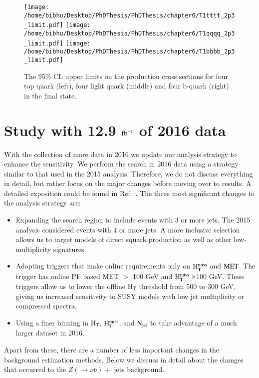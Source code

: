\begin{figure}[h]
\centering
\texttt{[image: /home/bibhu/Desktop/PhDThesis/PhDThesis/chapter6/T1tttt\_2p3\_limit.pdf]}
\texttt{[image: /home/bibhu/Desktop/PhDThesis/PhDThesis/chapter6/T1qqqq\_2p3\_limit.pdf]}
\texttt{[image: /home/bibhu/Desktop/PhDThesis/PhDThesis/chapter6/T1bbbb\_2p3\_limit.pdf]}
\caption{\label{fig:Limit2015}The 95\% CL upper limits on the production cross sections for four top quark (left), four light quark    (middle) and four b-quark (right) in the final state. }
\end{figure}



\section{Study with 12.9 $\bf \rm fb^{-1}$ of 2016 data}

With the collection of more data in 2016 we update our analysis strategy to enhance the sensitivity. We perform the search in 2016 data using a strategy similar to that used in the 2015 analysis. Therefore, we do not discuss everything in detail, but rather focus on the major changes before moving over to results. A detailed exposition could be found in Ref.~\cite{CMS-PAS-SUS-16-014}. The three most significant changes to the analysis strategy are:
\begin{itemize}
\item Expanding the search region to include events with 3 or more
  jets. The 2015 analysis considered events with 4 or more
  jets. A more inclusive selection allows us to target  models
  of direct squark production as well as other low-multiplicity signatures.
\item Adopting triggers that make online requirements only on $\rm H_{T}^{miss}$
  and $\rm MET$. The trigger has online PF based MET $>$ 100 GeV and  $\rm H_{T}^{miss} > $100 GeV.
  These triggers allow us to lower the offline $\rm H_{T}$ threshold from 500 to 300 GeV, giving us increased
  sensitivity to SUSY models with low jet multiplicity or compressed
  spectra.
\item Using a finer binning in $\rm H_{T}$, $\rm H_{T}^{miss}$,
and $\rm N_{jet}$ to take advantage of a much larger dataset in 2016.
\end{itemize}

Apart from these, there are a number of less important changes in the  background estimation methods. Below we discuss in detail about the changes that occurred to the $Z(\rightarrow \nu \bar{\nu})+$ jets background.


